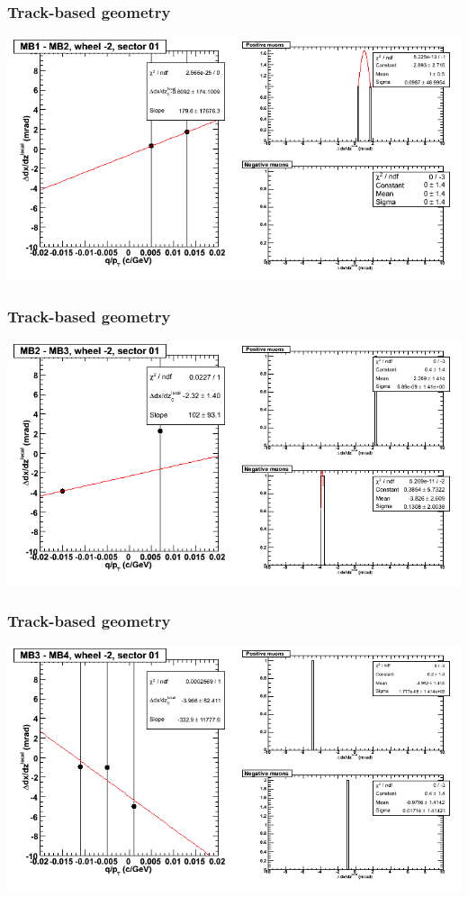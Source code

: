 \documentclass[compress]{beamer}
\begin{document}
\begin{frame}
\frametitle{Track-based geometry}
\includegraphics[width=\linewidth]{NOV4_segdiffs/dt13_slope_A_01_12.png}
\end{frame}

\begin{frame}
\frametitle{Track-based geometry}
\includegraphics[width=\linewidth]{NOV4_segdiffs/dt13_slope_A_01_23.png}
\end{frame}

\begin{frame}
\frametitle{Track-based geometry}
\includegraphics[width=\linewidth]{NOV4_segdiffs/dt13_slope_A_01_34.png}
\end{frame}
\end{document}
